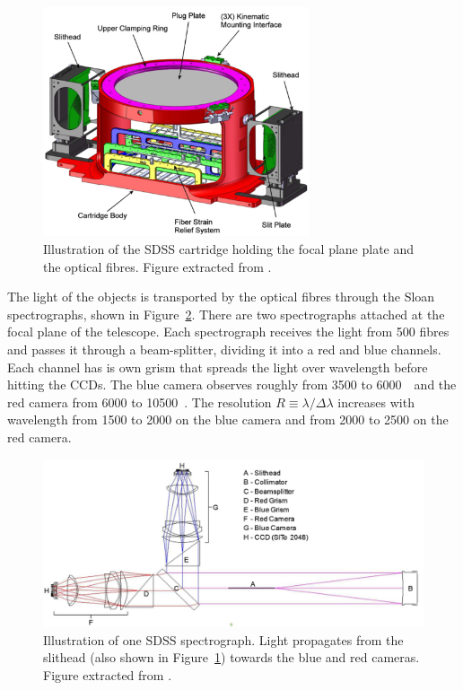 \begin{figure}
    \centering 
    \includegraphics[width=0.7\textwidth]{fig/spectro/cartridge.png}
    \caption{Illustration of the SDSS cartridge holding the focal plane plate and the optical fibres. 
    Figure extracted from \cite{smeeMultiobjectFiberfedSpectrographs2013}. }
    \label{fig:cartridge}
\end{figure}
 
The light of the objects is transported by the optical fibres through the 
Sloan spectrographs, shown in Figure~\ref{fig:spectrograph}. 
There are two spectrographs attached at the focal plane
of the telescope. Each spectrograph receives the light from 500 fibres and passes 
it through a beam-splitter, dividing it into a red and blue channels. 
Each channel has is own grism that spreads the light over wavelength before
hitting the CCDs. The blue camera observes roughly from 3500 to 6000~\angstrom\ and the red
camera from 6000 to 10500~\angstrom. The resolution $R \equiv \lambda / \Delta \lambda$ 
increases with wavelength from 1500 to 2000 on the blue camera and from 2000 to 2500 
on the red camera. 

\begin{figure}
    \centering 
    \includegraphics[width=\textwidth]{fig/spectro/spectrograph.png}
    \caption{Illustration of one SDSS spectrograph. 
    Light propagates from the slithead (also shown in Figure~\ref{fig:cartridge})
    towards the blue and red cameras. 
    Figure extracted from \cite{smeeMultiobjectFiberfedSpectrographs2013}. }
    \label{fig:spectrograph}
\end{figure}
 

